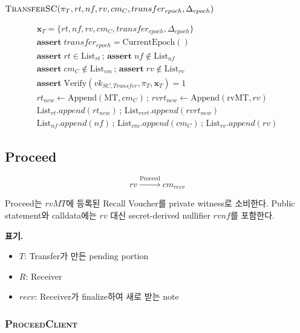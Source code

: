 \documentclass[11pt,a4paper]{extarticle}
\newcommand{\Verify}{\mathrm{Verify}}
\newcommand{\Append}{\mathrm{Append}}
\newcommand{\DeltaEpoch}{\Delta_{epoch}}
\newcommand{\Assert}{\mathbf{assert}\;}
\newcommand{\List}[1]{\mathrm{List}_{#1}}
\newcommand{\MT}{\mathrm{MT}}
\newcommand{\rvMT}{\mathrm{rvMT}}
\newcommand{\CurrentEpoch}{\mathrm{CurrentEpoch}}
\newenvironment{schemeblock}
{%
  \begingroup
  \setlength{\jot}{8pt}%
  \setlength{\parskip}{0pt}%
  \setlength{\abovedisplayskip}{9pt}%
  \setlength{\belowdisplayskip}{0pt}%
  \setlength{\abovedisplayshortskip}{9pt}%
  \setlength{\belowdisplayshortskip}{0pt}%
  \begin{mdframed}[
    linewidth=0.4pt,
    linecolor=black,
    innerleftmargin=8pt,
    innerrightmargin=8pt,
    innertopmargin=8pt,
    innerbottommargin=8pt,
    skipabove=0pt,
    skipbelow=5pt,
    splittopskip=8pt,
    splitbottomskip=8pt
  ]
  \centering
}
{%
  \end{mdframed}
  \endgroup
}
\begin{document}
\begin{schemeblock}
\(
  \textsc{TransferSC}(
    \pi_T,rt,nf,rv,cm_C,transfer_{epoch},\DeltaEpoch)
\)

\begin{gather*}
\mathbf{x}_T=\{
  rt,nf,rv,cm_C,transfer_{epoch},\DeltaEpoch\}
  \\
\Assert transfer_{epoch}=\CurrentEpoch()
  \\
\Assert rt\in\List{rt}
  \,;\,
  \Assert nf\notin\List{nf}
  \\
\Assert cm_C\notin\List{cm}
  \,;\,
  \Assert rv\notin\List{rv}
  \\
\Assert
  \Verify(vk_{SC,Transfer},\pi_T,\mathbf{x}_T)=1
  \\
rt_{new}\gets\Append(\MT,cm_C)
  \,;\,
  rvrt_{new}\gets\Append(\rvMT,rv)
  \\
\List{rt}.append(rt_{new})
  \,;\,
  \List{rvrt}.append(rvrt_{new})
  \\
\List{nf}.append(nf)
  \,;\,
  \List{cm}.append(cm_C)
  \,;\,
  \List{rv}.append(rv)
\end{gather*}
\end{schemeblock}

\subsection{Proceed}

\[
  rv\xrightarrow{\mathrm{Proceed}}cm_{recv}
\]

Proceed는 $rvMT$에 등록된 Recall Voucher를 private witness로 소비한다. Public
statement와 calldata에는 $rv$ 대신 secret-derived nullifier $rvnf$를 포함한다.

\noindent\textbf{표기.}
\begin{itemize}[nosep]
  \item $T$: Transfer가 만든 pending portion
  \item $R$: Receiver
  \item $recv$: Receiver가 finalize하여 새로 받는 note
\end{itemize}

\subsubsection{\textsc{ProceedClient}}
\end{document}

